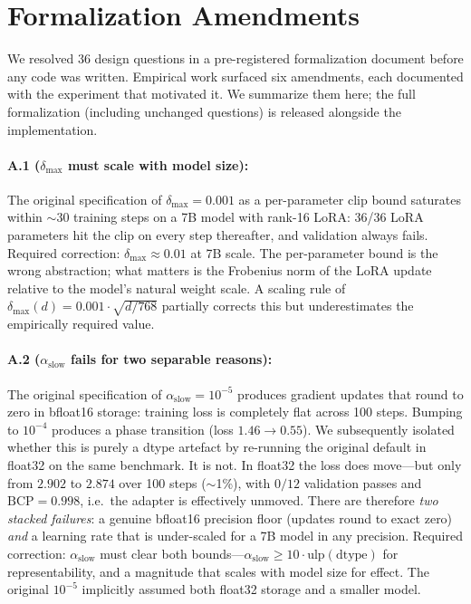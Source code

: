 
\appendix
\renewcommand{\thesection}{Annexure~\Alph{section}}
\renewcommand{\thesubsection}{\Alph{section}.\arabic{subsection}}

\section{Formalization Amendments}
\label{app:amendments}

We resolved 36 design questions in a pre-registered formalization document before any code was written. Empirical work surfaced six amendments, each documented with the experiment that motivated it. We summarize them here; the full formalization (including unchanged questions) is released alongside the implementation.

\paragraph{A.1 ($\delta_{\max}$ must scale with model size):} The original specification of $\delta_{\max}=0.001$ as a per-parameter clip bound saturates within $\sim 30$ training steps on a 7B model with rank-16 LoRA: 36/36 LoRA parameters hit the clip on every step thereafter, and validation always fails. Required correction: $\delta_{\max} \approx 0.01$ at 7B scale. The per-parameter bound is the wrong abstraction; what matters is the Frobenius norm of the LoRA update relative to the model's natural weight scale. A scaling rule of $\delta_{\max}(d) = 0.001 \cdot \sqrt{d / 768}$ partially corrects this but underestimates the empirically required value.

\paragraph{A.2 ($\alpha_{\mathrm{slow}}$ fails for two separable reasons):} The original specification of $\alpha_{\mathrm{slow}} = 10^{-5}$ produces gradient updates that round to zero in bfloat16 storage: training loss is completely flat across 100 steps. Bumping to $10^{-4}$ produces a phase transition (loss $1.46 \to 0.55$). We subsequently isolated whether this is purely a dtype artefact by re-running the original default in float32 on the same benchmark. It is not. In float32 the loss does move---but only from $2.902$ to $2.874$ over 100 steps ($\sim$1\%), with $0/12$ validation passes and $\mathrm{BCP} = 0.998$, i.e.\ the adapter is effectively unmoved. There are therefore \emph{two stacked failures}: a genuine bfloat16 precision floor (updates round to exact zero) \emph{and} a learning rate that is under-scaled for a 7B model in any precision. Required correction: $\alpha_{\mathrm{slow}}$ must clear both bounds---$\alpha_{\mathrm{slow}} \geq 10 \cdot \mathrm{ulp}(\mathrm{dtype})$ for representability, and a magnitude that scales with model size for effect. The original $10^{-5}$ implicitly assumed both float32 storage and a smaller model.

